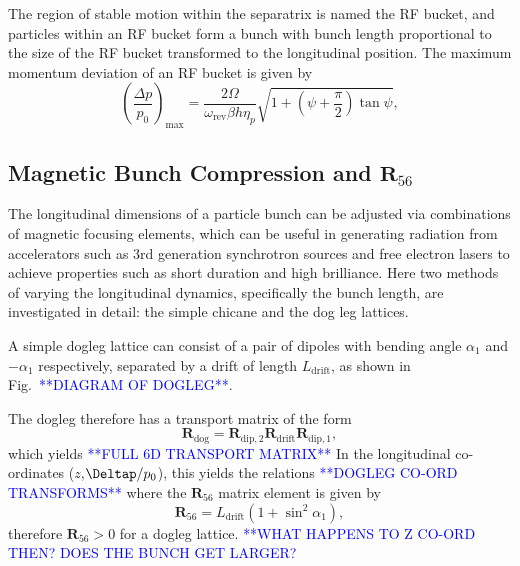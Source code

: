 \documentclass[../main.tex]{subfiles}
\begin{document}
The region of stable motion within the separatrix is named the RF bucket, and particles within an RF bucket form a bunch with bunch length proportional to the size of the RF bucket transformed to the longitudinal position. The maximum momentum deviation of an RF bucket is given by \cite{wolski2012longitudinal}
\begin{equation}
\left(\frac{\Delta p}{p_{0}}\right)_{\mathrm{max}} = \frac{2\Omega}{\omega_{\mathrm{rev}}\beta h\eta_{p}}\sqrt{1+\left(\psi+\frac{\pi}{2}\right)\tan\psi},
\label{eq:RF_bucket_momentum_deviation}    
\end{equation}

\subsection{Magnetic Bunch Compression and $\boldsymbol{R}_{56}$}

The longitudinal dimensions of a particle bunch can be adjusted via combinations of magnetic focusing elements, which can be useful in generating radiation from accelerators such as 3rd generation synchrotron sources and free electron lasers to achieve properties such as short duration and high brilliance. Here two methods of varying the longitudinal dynamics, specifically the bunch length, are investigated in detail: the simple chicane and the dog leg lattices.

A simple dogleg lattice can consist of a pair of dipoles with bending angle $\alpha_{1}$ and $-\alpha_{1}$ respectively, separated by a drift of length $L_{\mathrm{drift}}$, as shown in Fig.~\textcolor{blue}{**DIAGRAM OF DOGLEG**}.

The dogleg therefore has a transport matrix of the form
\begin{equation}
\boldsymbol{R}_{\mathrm{dog}} = \boldsymbol{R}_{\mathrm{dip,2}}\boldsymbol{R}_{\mathrm{drift}}\boldsymbol{R}_{\mathrm{dip,1}},
\label{eq:dogleg_transport_matrix_simple}    
\end{equation}
which yields 
\textcolor{blue}{**FULL 6D TRANSPORT MATRIX**}
In the longitudinal co-ordinates ($z$,$\Deltap/p_{0}$), this yields the relations
\textcolor{blue}{**DOGLEG CO-ORD TRANSFORMS**}
where the $\boldsymbol{R}_{56}$ matrix element is given by
\begin{equation}
\boldsymbol{R}_{56} = L_{\mathrm{drift}}\left(1+\sin^{2}\alpha_{1}\right),
\label{eq:dogleg_R56}    
\end{equation}
therefore $\boldsymbol{R}_{56}>0$ for a dogleg lattice. 
\textcolor{blue}{**WHAT HAPPENS TO Z CO-ORD THEN? DOES THE BUNCH GET LARGER?}
\end{document}
